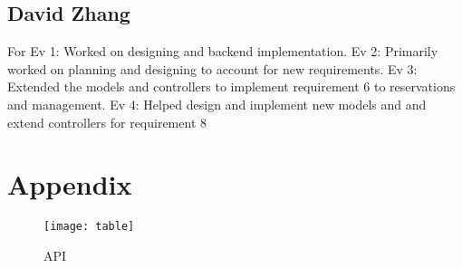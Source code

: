 \documentclass{article}
\begin{document}
\subsection{David Zhang}
For Ev 1: Worked on designing and backend implementation. Ev 2: Primarily worked on planning and designing to account for new requirements. Ev 3: Extended the models and controllers to implement requirement 6 to reservations and management. Ev 4: Helped design and implement new models and and extend controllers for requirement 8
\section{Appendix}

\begin{figure}[h]
\centering
\texttt{[image: table]}
\caption{API}
\end{figure}
\end{document}
